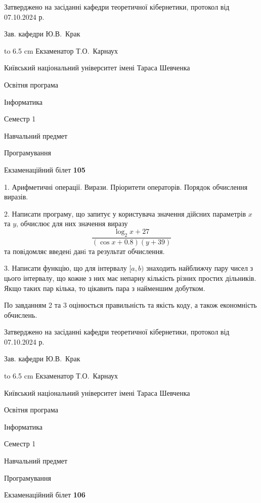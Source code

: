\documentclass[12pt, ukrainian]{article}
\begin{document}
{\smallskip\smallskip \begin {scriptsize} Затверджено на засіданні кафедри теоретичної кібернетики, протокол   від   07.10.2024 р.\par\smallskip\smallskip\smallskip\smallskip
{\parbox {6.5 cm} {Зав. кафедри \dotfill Ю.В.~Крак}}\hspace {0.7cm} {\hbox to 6.5 cm { Екзаменатор \dotfill Т.О.~Карнаух}} \end{scriptsize}}
\vspace{0.9cm}
{{\begin {scriptsize}\par
{ \center  Київський національний університет імені Тараса Шевченка \par}
{\parbox {5 cm}{Освітня програма \hfill}{\parbox {7 cm}{Інформатика\hfill}}\parbox {6 cm}{\hfill Семестр 1}}\par
{\parbox {5 cm} {Навчальний предмет \hfill}\parbox {7 cm}{Програмування \hfill}\parbox {6cm}{\hfill}\par}\vspace{-15pt} \end{scriptsize}}{\center Екзаменаційний білет \No \textbf { 105 }\par}}
{%
1. Арифметичні операції. Вирази. Пріоритети операторів. Порядок обчислення виразів.%
\par
2. Написати програму, що запитує у користувача значення дійсних параметрів $x$ та $y$, обчислює для них значення виразу 
$$\frac{\log_{2} x + 27}{(\cos x + 0.8) (y + 39)}$$ 
та повiдомляє введенi данi та результат обчислення.

\par
3. Написати функцію, що для інтервалу $[a, b)$ знаходить найближчу пару чисел з цього інтервалу, що кожне з них має непарну кількість різних простих дільників. Якщо таких пар кілька, то цікавить пара з найменшим добутком.

По завданням 2 та 3 оцінюється правильність та якість коду, а також економність обчислень.

}
{\smallskip\smallskip \begin {scriptsize} Затверджено на засіданні кафедри теоретичної кібернетики, протокол   від   07.10.2024 р.\par\smallskip\smallskip\smallskip\smallskip
{\parbox {6.5 cm} {Зав. кафедри \dotfill Ю.В.~Крак}}\hspace {0.7cm} {\hbox to 6.5 cm { Екзаменатор \dotfill Т.О.~Карнаух}} \end{scriptsize}}
\newpage
{{\begin {scriptsize}\par
{ \center  Київський національний університет імені Тараса Шевченка \par}
{\parbox {5 cm}{Освітня програма \hfill}{\parbox {7 cm}{Інформатика\hfill}}\parbox {6 cm}{\hfill Семестр 1}}\par
{\parbox {5 cm} {Навчальний предмет \hfill}\parbox {7 cm}{Програмування \hfill}\parbox {6cm}{\hfill}\par}\vspace{-15pt} \end{scriptsize}}{\center Екзаменаційний білет \No \textbf { 106 }\par}}
\end{document}
